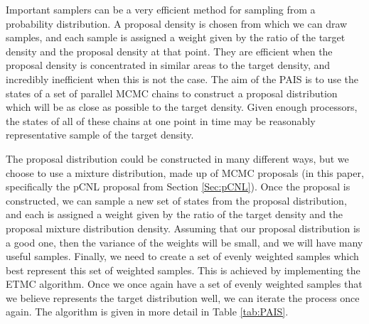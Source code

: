 \documentclass[final]{siamltex}
\begin{document}


Important samplers can be a very efficient method for sampling from a
probability distribution. A proposal density is chosen from which we
can draw samples, and each sample is assigned a weight given by the
ratio of the target density and the proposal density at that
point. They are efficient when the proposal density is concentrated in
similar areas to the target density, and incredibly inefficient when
this is not the case. The aim of the PAIS is to use the states of a
set of parallel MCMC chains to construct a proposal distribution which
will be as close as possible to the target density. Given enough
processors, the states of all of these chains at one point
in time may be reasonably representative sample of the target density.

The proposal distribution could be constructed in many different ways,
but we choose to use a mixture distribution, made up of MCMC proposals
(in this paper, specifically the pCNL proposal from Section \ref{Sec:pCNL}). Once the proposal is
constructed, we can sample a new set of states from the proposal
distribution, and each is assigned a weight given by the ratio of the target
density and the proposal mixture distribution density. Assuming that
our proposal distribution is a good one, then the variance of the
weights will be small, and we will have many useful samples. Finally, we
need to create a set of evenly weighted samples which best represent
this set of weighted samples. This is achieved by implementing the
ETMC algorithm. Once we once again have a set of evenly weighted
samples that we believe represents the target distribution well, we
can iterate the process once again. The algorithm is given in more detail in Table \ref{tab:PAIS}. 
\end{document}

